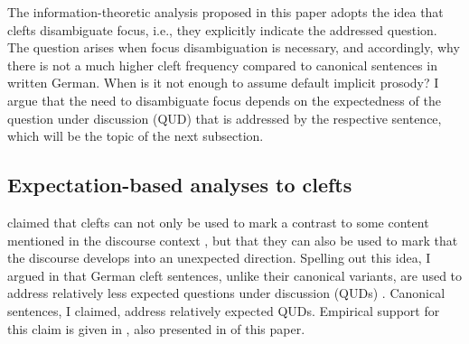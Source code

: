 \documentclass[output=paper,colorlinks,citecolor=brown]{langscibook}
\begin{document}
The information-theoretic analysis proposed in this paper adopts the idea that clefts disambiguate focus, i.e., they explicitly indicate the addressed question. The question arises when focus disambiguation is necessary, and accordingly, why there is not a much higher cleft frequency compared to canonical sentences in written German. When is it not enough to assume default implicit prosody? I argue that the need to disambiguate focus depends on the expectedness of the question under discussion (QUD) that is addressed by the respective sentence, which will be the topic of the next subsection.

\subsection{Expectation-based analyses to clefts}\label{subsec:exp}
\citet{destruel_velleman_2014} claimed that clefts can not only be used to mark a contrast to some content mentioned in the discourse context \citep[as in][]{rochemont_1986}, but that they can also be used to mark that the discourse develops into an unexpected direction. Spelling out this idea, I argued in \citet{tonnis_2021} that German cleft sentences, unlike their canonical variants, are used to address relatively less expected questions under discussion (QUDs) \citep[following][]{roberts_2012}. Canonical sentences, I claimed, address relatively expected QUDs. Empirical support for this claim is given in \citet{tonnis_tonhauser_2022}, also presented in  of this paper.
\end{document}
